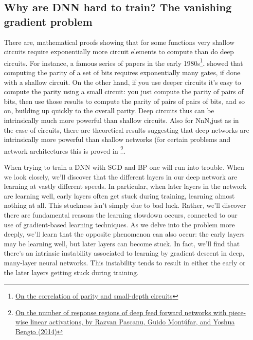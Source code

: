 \documentclass[12pt, letterpaper]{article}
\theoremstyle{definition}
\begin{document}
\subsection{Why are DNN hard to train? The vanishing gradient problem}
There are, mathematical proofs showing that for some functions very shallow circuits require exponentially more circuit elements to compute than do deep circuits. For instance, a famous series of papers in the early 1980s\footnote{\href{http://eccc.hpi-web.de/report/2012/137/}{On the correlation of parity and small-depth circuits}}. showed that computing the parity of a set of bits requires exponentially many gates, if done with a shallow circuit. On the other hand, if you use deeper circuits it's easy to compute the parity using a small circuit: you just compute the parity of pairs of bits, then use those results to compute the parity of pairs of pairs of bits, and so on, building up quickly to the overall parity. Deep circuits thus can be intrinsically much more powerful than shallow circuits. Also for NnN,just as in the case of circuits, there are theoretical results suggesting that deep networks are intrinsically more powerful than shallow networks (for certain problems and network architectures this is proved in \footnote{\href{https://arxiv.org/pdf/1312.6098.pdf}{On the number of response regions of deep feed forward networks with piece-wise linear activations, by Razvan Pascanu, Guido Montúfar, and Yoshua Bengio (2014)}}.

When trying to train a DNN with SGD and BP one will run into trouble. When we look closely, we'll discover that the different layers in our deep network are learning at vastly different speeds. In particular, when later layers in the network are learning well, early layers often get stuck during training, learning almost nothing at all. This stuckness isn't simply due to bad luck. Rather, we'll discover there are fundamental reasons the learning slowdown occurs, connected to our use of gradient-based learning techniques. As we delve into the problem more deeply, we'll learn that the opposite phenomenon can also occur: the early layers may be learning well, but later layers can become stuck. In fact, we'll find that there's an intrinsic instability associated to learning by gradient descent in deep, many-layer neural networks. This instability tends to result in either the early or the later layers getting stuck during training.
\end{document}
